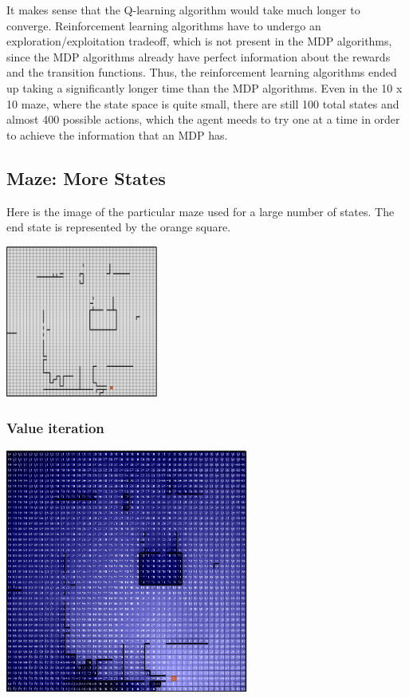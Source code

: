 \documentclass[11pt]{article}
\begin{document}
            It makes sense that the Q-learning algorithm would take much longer to
            converge. Reinforcement learning algorithms have to undergo an exploration/exploitation
            tradeoff, which is not present in the MDP algorithms, since the MDP algorithms
            already have perfect information about the rewards and the transition functions.
            Thus, the reinforcement learning algorithms ended up taking a significantly
            longer time than the MDP algorithms. Even in the 10 x 10 maze, where
            the state space is quite small, there are still 100 total states and almost 400
            possible actions, which the agent meeds to try one at a time in order to achieve
            the information that an MDP has.

        \subsection{Maze: More States}

            Here is the image of the particular maze used for a large
            number of states. The end state is represented by the orange square.

            \includegraphics[width=5cm]{../images/large/maze.PNG}
            

            \subsubsection{Value iteration}

            \includegraphics[width=8cm]{../images/large/vi.PNG}
\end{document}
